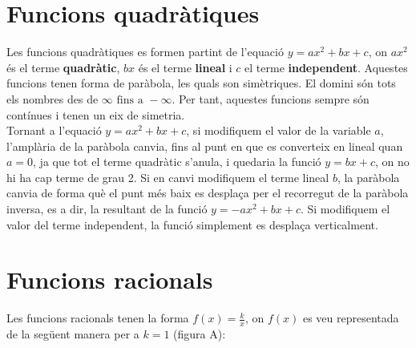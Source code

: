 \documentclass[12pt,a4paper]{article}
\begin{document}
\section{Funcions quadràtiques}

Les funcions quadràtiques es formen partint de l'equació \(y = ax^2+bx+c\), on \(ax^2\) és el terme \textbf{quadràtic}, \(bx\) és el terme \textbf{lineal} i \(c\) el terme \textbf{independent}. Aquestes funcions tenen forma de paràbola, les quals son simètriques. El domini són tots els nombres des de \(\infty \text{ fins a } -\infty\). Per tant, aquestes funcions sempre són contínues i tenen un eix de simetria.\\

Tornant a l'equació \(y = ax^2+bx+c\), si modifiquem el valor de la variable \(a\), l'amplària de la paràbola canvia, fins al punt en que es converteix en lineal quan \(a = 0\), ja que tot el terme quadràtic s'anula, i quedaria la funció \(y = bx+c\), on no hi ha cap terme de grau 2. Si en canvi modifiquem el terme lineal \(b\), la paràbola canvia de forma què el punt més baix es desplaça per el recorregut de la paràbola inversa, es a dir, la resultant de la funció \(y = -ax^2+bx+c\). Si modifiquem el valor del terme independent, la funció simplement es desplaça verticalment.

\section{Funcions racionals}

Les funcions racionals tenen la forma \(f(x) = \frac{k}{x}\), on \(f(x)\) es veu representada de la següent manera per a \(k = 1\) (figura A):

\begin{figure}[h]
	\centering
\end{figure}
\end{document}

